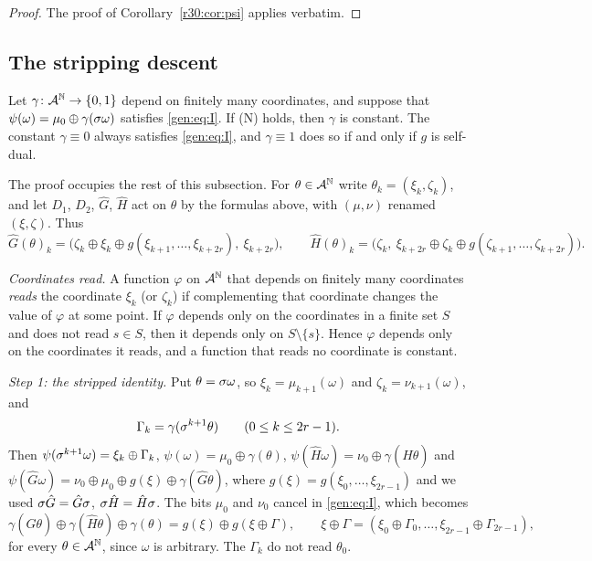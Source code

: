 \begin{proof}
The proof of Corollary~\ref{r30:cor:psi} applies verbatim.
\end{proof}

\subsection{The stripping descent}\label{gen:sec:strip}

\begin{proposition}\label{gen:prop:strip}
Let $\gamma\colon\mathcal{A}^{\mathbb N}\to\{0,1\}$ depend on finitely many coordinates, and suppose that $\psi(\omega)=\mu_0\oplus\gamma(\sigma\omega)$ satisfies \eqref{gen:eq:I}. If \textup{(N)} holds, then $\gamma$ is constant. The constant $\gamma\equiv0$ always satisfies \eqref{gen:eq:I}, and $\gamma\equiv1$ does so if and only if $g$ is self-dual.
\end{proposition}

The proof occupies the rest of this subsection. For $\theta\in\mathcal{A}^{\mathbb N}$ write $\theta_k=(\xi_k,\zeta_k)$, and let $D_1$, $D_2$, $\hat G$, $\hat H$ act on $\theta$ by the formulas above, with $(\mu,\nu)$ renamed $(\xi,\zeta)$. Thus
\[
\hat G(\theta)_k=\bigl(\zeta_k\oplus\xi_k\oplus g(\xi_{k+1},\dots,\xi_{k+2r}),\ \xi_{k+2r}\bigr),\qquad \hat H(\theta)_k=\bigl(\zeta_k,\ \xi_{k+2r}\oplus\zeta_k\oplus g(\zeta_{k+1},\dots,\zeta_{k+2r})\bigr).
\]

\emph{Coordinates read.} A function $\varphi$ on $\mathcal{A}^{\mathbb N}$ that depends on finitely many coordinates \emph{reads} the coordinate $\xi_k$ (or $\zeta_k$) if complementing that coordinate changes the value of $\varphi$ at some point. If $\varphi$ depends only on the coordinates in a finite set $S$ and does not read $s\in S$, then it depends only on $S\setminus\{s\}$. Hence $\varphi$ depends only on the coordinates it reads, and a function that reads no coordinate is constant.

\emph{Step 1: the stripped identity.} Put $\theta=\sigma\omega$, so $\xi_k=\mu_{k+1}(\omega)$ and $\zeta_k=\nu_{k+1}(\omega)$, and
\[
\Gamma_k=\gamma(\sigma^{k+1}\theta)\qquad(0\le k\le2r-1).
\]
Then $\psi(\sigma^{k+1}\omega)=\xi_k\oplus\Gamma_k$, $\psi(\omega)=\mu_0\oplus\gamma(\theta)$, $\psi(\hat H\omega)=\nu_0\oplus\gamma(\hat H\theta)$ and $\psi(\hat G\omega)=\nu_0\oplus\mu_0\oplus g(\xi)\oplus\gamma(\hat G\theta)$, where $g(\xi)=g(\xi_0,\dots,\xi_{2r-1})$ and we used $\sigma\hat G=\hat G\sigma$, $\sigma\hat H=\hat H\sigma$. The bits $\mu_0$ and $\nu_0$ cancel in \eqref{gen:eq:I}, which becomes
\begin{equation}\label{gen:eq:star}
\gamma(\hat G\theta)\oplus\gamma(\hat H\theta)\oplus\gamma(\theta)=g(\xi)\oplus g(\xi\oplus\Gamma),\qquad \xi\oplus\Gamma=(\xi_0\oplus\Gamma_0,\dots,\xi_{2r-1}\oplus\Gamma_{2r-1}),
\end{equation}
for every $\theta\in\mathcal{A}^{\mathbb N}$, since $\omega$ is arbitrary. The $\Gamma_k$ do not read $\theta_0$.

